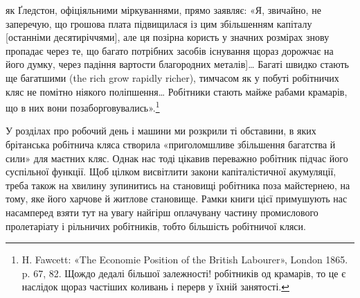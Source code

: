 як Ґледстон, офіціяльними міркуваннями, прямо заявляє:
«Я, звичайно, не заперечую, що грошова плата підвищилася із
цим збільшенням капіталу [останніми десятиріччями], але ця
позірна користь у значних розмірах знову пропадає через те,
що багато потрібних засобів існування щораз дорожчає на його
думку, через падіння вартости благородних металів]\dots{} Багаті
швидко стають ще багатшими (the rich grow rapidly richer),
тимчасом як у побуті робітничих кляс не помітно ніякого поліпшення\dots{}
Робітники стають майже рабами крамарів, що в них
вони позаборговувались».\footnote{
H. Fawcett: «The Economie Position of the British Labourer»,
London 1865. p. 67, 82. Щождо дедалі більшої залежності! робітників од
крамарів, то це є наслідок щораз частіших коливань і перерв у їхній
занятості.
}

У розділах про робочий день і машини ми розкрили ті обставини,
в яких брітанська робітнича кляса створила «приголомшливе
збільшення багатства й сили» для маєтних кляс. Однак
нас тоді цікавив переважно робітник підчас його суспільної
функції. Щоб цілком висвітлити закони капіталістичної акумуляції,
треба також на хвилину зупинитись на становищі робітника
поза майстернею, на тому, яке його харчове й житлове становище.
Рамки книги цієї примушують нас насамперед взяти тут на увагу
найгірш оплачувану частину промислового пролетаріату і рільничих
робітників, тобто більшість робітничої кляси.
